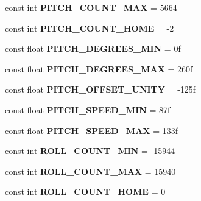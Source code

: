 \begin{DoxyCompactItemize}
const int {\bfseries P\+I\+T\+C\+H\+\_\+\+C\+O\+U\+N\+T\+\_\+\+M\+AX} = 5664
\item 
\mbox{\label{class_scorbot_e_r_v_plus_ae92515118ebb9a15ed56075a6cf410c4}} 
const int {\bfseries P\+I\+T\+C\+H\+\_\+\+C\+O\+U\+N\+T\+\_\+\+H\+O\+ME} = -\/2
\item 
\mbox{\label{class_scorbot_e_r_v_plus_a13f78e7144ba04b7e4256fde7f3d078f}} 
const float {\bfseries P\+I\+T\+C\+H\+\_\+\+D\+E\+G\+R\+E\+E\+S\+\_\+\+M\+IN} = 0f
\item 
\mbox{\label{class_scorbot_e_r_v_plus_a52fba79ce543d5527e1792dc72656dde}} 
const float {\bfseries P\+I\+T\+C\+H\+\_\+\+D\+E\+G\+R\+E\+E\+S\+\_\+\+M\+AX} = 260f
\item 
\mbox{\label{class_scorbot_e_r_v_plus_ab1d9b24e07da71df013d818cbcfc81ba}} 
const float {\bfseries P\+I\+T\+C\+H\+\_\+\+O\+F\+F\+S\+E\+T\+\_\+\+U\+N\+I\+TY} = -\/125f
\item 
\mbox{\label{class_scorbot_e_r_v_plus_aa6e58e313ecef3017eff2ed96d113fcf}} 
const float {\bfseries P\+I\+T\+C\+H\+\_\+\+S\+P\+E\+E\+D\+\_\+\+M\+IN} = 87f
\item 
\mbox{\label{class_scorbot_e_r_v_plus_aaf633722272caef41328d57ad9ae7f41}} 
const float {\bfseries P\+I\+T\+C\+H\+\_\+\+S\+P\+E\+E\+D\+\_\+\+M\+AX} = 133f
\item 
\mbox{\label{class_scorbot_e_r_v_plus_a727be3e6188a55308291d7f9531cbbd4}} 
const int {\bfseries R\+O\+L\+L\+\_\+\+C\+O\+U\+N\+T\+\_\+\+M\+IN} = -\/15944
\item 
\mbox{\label{class_scorbot_e_r_v_plus_a6b4dccd567267712c12fde6fc8cc06b6}} 
const int {\bfseries R\+O\+L\+L\+\_\+\+C\+O\+U\+N\+T\+\_\+\+M\+AX} = 15940
\item 
\mbox{\label{class_scorbot_e_r_v_plus_a913690cd60c5fd21a1fe275a54743fae}} 
const int {\bfseries R\+O\+L\+L\+\_\+\+C\+O\+U\+N\+T\+\_\+\+H\+O\+ME} = 0
\item 
\mbox{\label{class_scorbot_e_r_v_plus_a7f8cb0f5ef4d1b2d898a93de44aead31}} 

\end{DoxyCompactItemize}
